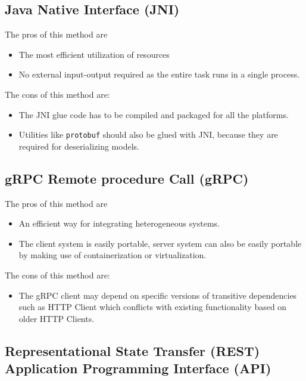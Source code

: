 \documentclass[letterpaper, 10 pt, conference]{ieeeconf}  %
\begin{document}
\subsection{Java Native Interface (JNI)} \label{sec:eval-jni}

The pros of this method are
\begin{itemize}
\item The most efficient utilization of resources
\item No external input-output required as the entire task runs in a single process.
\end{itemize}

The cons of this method are:
\begin{itemize}
  \item The JNI glue code has to be compiled and packaged for all the platforms.
  \item Utilities like \texttt{protobuf} should also be glued with JNI, because they are required for deserializing models\cite{javacpp-240}.
\end{itemize}

\subsection{gRPC Remote procedure Call (gRPC)} \label{sec:eval-rpc}

The pros of this method are
\begin{itemize}
\item An efficient way for integrating heterogeneous systems.
\item The client system is easily portable, server system can also be easily portable by making use of containerization or virtualization.
\end{itemize}

The cons of this method are:
\begin{itemize}
  \item The gRPC client may depend on specific versions of transitive dependencies such as HTTP Client which conflicts with existing functionality based on older HTTP Clients.
\end{itemize}

\subsection{Representational State Transfer (REST) Application Programming Interface (API)} \label{sec:eval-rest}
\end{document}
